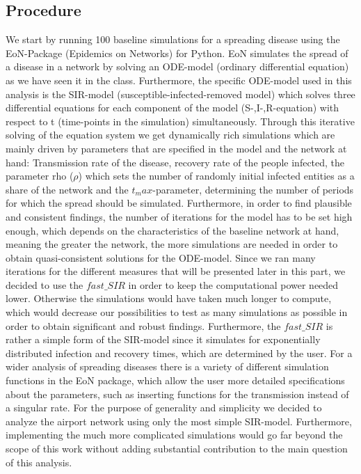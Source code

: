 \documentclass{Template resources/netsci-project}
\begin{document}
\subsection{Procedure}
We start by running 100 baseline simulations for a spreading disease using the EoN-Package (Epidemics on Networks) for Python. EoN simulates the spread of a disease in a network by solving an ODE-model (ordinary differential equation) as we have seen it in the class. Furthermore, the specific ODE-model used in this analysis is the SIR-model (susceptible-infected-removed model) which solves three differential equations for each component of the model (S-,I-,R-equation) with respect to t (time-points in the simulation) simultaneously. Through this iterative solving of the equation system we get dynamically rich simulations which are mainly driven by parameters that are specified in the model and the network at hand: Transmission rate of the disease, recovery rate of the people infected, the parameter rho ($\rho$) which sets the number of randomly initial infected entities as a share of the network and the 
$t_max$-parameter, determining the number of periods for which the spread should be simulated. Furthermore, in order to find plausible and consistent findings, the number of iterations for the model has to be set high enough, which depends on the characteristics of the baseline network at hand, meaning the greater the network, the more simulations are needed in order to obtain quasi-consistent solutions for the ODE-model. Since we ran many iterations for the different measures that will be presented later in this part, we decided to use the $fast\_SIR$ in order to keep the computational power needed lower. Otherwise the simulations would have taken much longer to compute, which would decrease our possibilities to test as many simulations as possible in order to obtain significant and robust findings. Furthermore, the $fast\_SIR$ is rather a simple form of the SIR-model since it simulates for exponentially distributed infection and recovery times, which are determined by the user. For a wider analysis of spreading diseases there is a variety of different simulation functions in the EoN package, which allow the user more detailed specifications about the parameters, such as inserting functions for the transmission instead of a singular rate. For the purpose of generality and simplicity we decided to analyze the airport network using only the most simple SIR-model. Furthermore, implementing the much more complicated simulations would go far beyond the scope of this work without adding substantial contribution to the main question of this analysis.  
\end{document}
